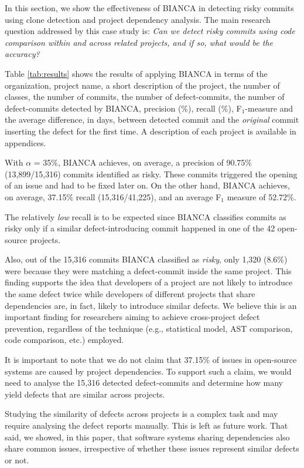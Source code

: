 \documentclass[12pt]{report}
\begin{document}
In this section, we show the effectiveness of BIANCA in detecting risky
commits using clone detection and project dependency analysis. The main
research question addressed by this case study is: \emph{Can we detect
risky commits using code comparison within and across related projects,
and if so, what would be the accuracy?}

Table \ref{tab:results} shows the results of applying BIANCA in terms of
the organization, project name, a short description of the project, the
number of classes, the number of commits, the number of defect-commits,
the number of defect-commits detected by BIANCA, precision (\%), recall
(\%), F\(_1\)-measure and the average difference, in days, between
detected commit and the \emph{original} commit inserting the defect for
the first time. A description of each project is available in
appendices.

With \(\alpha\) = 35\%, BIANCA achieves, on average, a precision of
90.75\% (13,899/15,316) commits identified as risky. These commits
triggered the opening of an issue and had to be fixed later on. On the
other hand, BIANCA achieves, on average, 37.15\% recall (15,316/41,225),
and an average F\(_1\) measure of 52.72\%.



The relatively \emph{low} recall is to be expected since BIANCA
classifies commits as risky only if a similar defect-introducing commit
happened in one of the 42 open-source projects.

Also, out of the 15,316 commits BIANCA classified as \emph{risky}, only
1,320 (8.6\%) were because they were matching a defect-commit inside the
same project. This finding supports the idea that developers of a
project are not likely to introduce the same defect twice while
developers of different projects that share dependencies are, in fact,
likely to introduce similar defects. We believe this is an important
finding for researchers aiming to achieve cross-project defect
prevention, regardless of the technique (e.g., statistical model, AST
comparison, code comparison, etc.) employed.

It is important to note that we do not claim that 37.15\% of issues in
open-source systems are caused by project dependencies. To support such
a claim, we would need to analyse the 15,316 detected defect-commits and
determine how many yield defects that are similar across projects.

Studying the similarity of defects across projects is a complex task and
may require analysing the defect reports manually. This is left as
future work. That said, we showed, in this paper, that software systems
sharing dependencies also share common issues, irrespective of whether
these issues represent similar defects or not.
\end{document}
